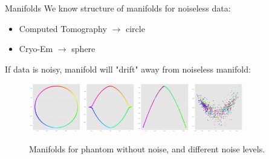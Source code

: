 \documentclass[aspectratio=169]{beamer}
\begin{document}
\begin{frame}[c]{Manifolds}
    We know structure of manifolds for noiseless data:
    \begin{itemize}
        \item Computed Tomography $\to$ circle
        \item Cryo-Em $\to$ sphere
    \end{itemize}

    If data is noisy, manifold will "drift" away from noiseless manifold:
    \begin{figure}
        \includegraphics[width=0.2\textwidth]{phantom_second_third_evec}
        \includegraphics[width=0.2\textwidth]{phantom_second_third_evec_noisy}
        \includegraphics[width=0.2\textwidth]{phantom_second_third_evec_noisy2}
        \includegraphics[width=0.2\textwidth]{phantom_second_third_evec_noisy_high}
        \caption{Manifolds for phantom without noise, and different noise levels.}
    \end{figure}
\end{frame}
\end{document}
